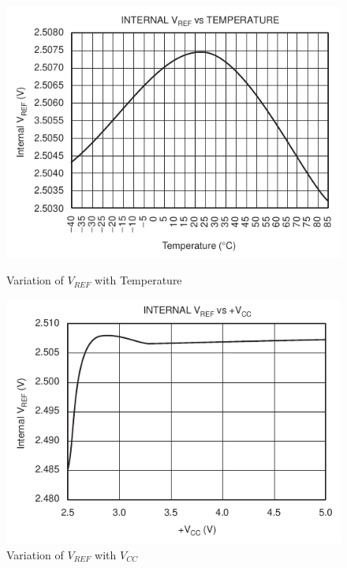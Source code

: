 \documentclass[11pt,a4paper,titlepage]{article}
\begin{document}
			\begin{figure}[htbp]
				\begin{minipage}{.5\textwidth}
					\centering
					\includegraphics[width=\textwidth]{v_ref_temp.png}
					\caption{Variation of $V_{REF}$ with Temperature}
					\label{fig:vref_temp}
				\end{minipage}
				\begin{minipage}{.5\textwidth}
					\centering
					\includegraphics[width=\textwidth]{v_ref_vcc.png}
					\caption{Variation of $V_{REF}$ with $V_{CC}$}
					\label{fig:vref_vcc}
				\end{minipage}
			\end{figure}
\end{document}
